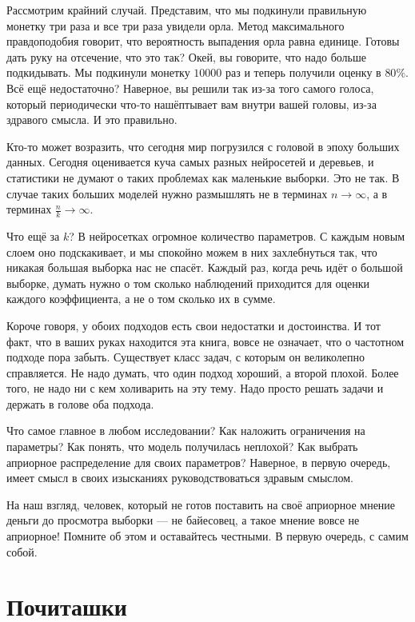 Рассмотрим крайний случай. Представим, что мы подкинули правильную монетку три раза и все три раза увидели орла. Метод максимального правдоподобия говорит, что вероятность выпадения орла равна единице. Готовы дать руку на отсечение, что это так? Окей, вы говорите, что надо больше подкидывать. Мы подкинули монетку $10 000$ раз и теперь получили оценку в $80\%$. Всё ещё недостаточно? Наверное, вы решили так из-за того самого голоса, который периодически что-то нашёптывает вам внутри вашей головы, из-за здравого смысла. И это правильно.

Кто-то может возразить, что сегодня мир погрузился с головой в эпоху больших данных. Сегодня оценивается куча самых разных нейросетей и деревьев, и статистики не думают о таких проблемах как маленькие выборки. Это не так. В случае таких больших моделей нужно размышлять не в терминах $n \to \infty$, а в терминах $\frac{n}{k} \to \infty$. 

Что ещё за $k$? В нейросетках огромное количество параметров. С каждым новым слоем оно подскакивает, и мы спокойно можем в них захлебнуться так, что никакая большая выборка нас не спасёт. Каждый раз, когда речь идёт о большой выборке, думать нужно о том сколько наблюдений приходится для оценки каждого коэффициента, а не о том сколько их в сумме.

Короче говоря, у обоих подходов есть свои недостатки и достоинства. И тот факт, что в ваших руках находится эта книга, вовсе не означает, что о частотном подходе пора забыть. Существует класс задач, с которым он великолепно справляется. Не надо думать, что один подход хороший, а второй плохой. Более того, не надо ни с кем холиварить на эту тему. Надо просто решать задачи и держать в голове оба подхода.

Что самое главное в любом исследовании? Как наложить ограничения на параметры? Как понять, что модель получилась неплохой? Как выбрать априорное распределение для своих параметров? Наверное, в первую очередь, имеет смысл в своих изысканиях руководствоваться здравым смыслом.

На наш взгляд, человек, который не готов поставить на своё априорное мнение деньги до просмотра выборки --- не байесовец, а такое мнение вовсе не априорное! Помните об этом и оставайтесь честными. В первую очередь, с самим собой.


\section{Почиташки}


